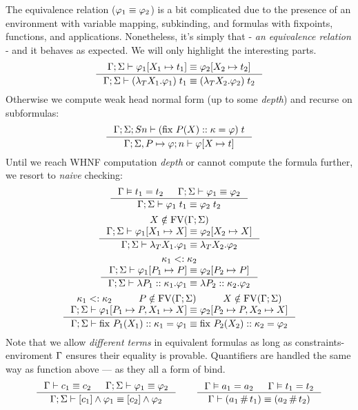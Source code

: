 \documentclass[english, mgr]{iithesis}
\begin{document}
The equivalence relation ($\varphi_1 \equiv \varphi_2$) is a bit complicated
due to the presence of an environment with variable mapping, subkinding, and formulas
with fixpoints, functions, and applications.
Nonetheless, it's simply that - \textit{an equivalence relation} - and it
behaves as expected. We will only highlight the interesting parts.
$$
  \inference{
    \jgmnt[\Gamma; \Sigma]{\formphi_1[\termv_1 \mapsto  \term_1] \equiv \formphi_2[\termv_2 \mapsto \term_2] }
    }{
    \jgmnt[\Gamma; \Sigma]{(\fLamTerm{\termv_1}\formphi_1) \fAppTerm \term_1 \equiv (\fLamTerm{\termv_2}\formphi_2) \fAppTerm \term_2}
  }
$$
Otherwise we compute weak head normal form (up to some \textit{depth}) and recurse on subformulas:
$$
  \inference{
    \jgmnt[\Gamma; \Sigma; S n]{(\fix{P}{\termv}{\kind}\formphi) \fAppTerm \term}
    }{
    \jgmnt[\Gamma; \Sigma, P \mapsto \formphi; n]{\formphi[\termv \mapsto \term]}
  }
$$
Until we reach WHNF computation \textit{depth} or cannot compute the formula further,
we resort to \textit{naive} checking:
$$
  \inference{
    \cjgmnt[\Gamma]{\term_1 \ceq \term_2} &
    \jgmnt[\Gamma; \Sigma]{\formphi_1 \equiv \formphi_2 }
    }{
    \jgmnt[\Gamma; \Sigma]{\formphi_1 \fAppTerm \term_1 \equiv \formphi_2 \fAppTerm \term_2 }
  }
$$
$$
  \inference{
    \termv \notin \fv[\Gamma; \Sigma] \\
    \jgmnt[\Gamma; \Sigma]{\formphi_1[\termv_1 \mapsto \termv] \equiv \formphi_2[\termv_2 \mapsto \termv] }
    }{
    \jgmnt[\Gamma; \Sigma]{\fLamTerm{\termv_1}\formphi_1 \equiv \fLamTerm{\termv_2}\formphi_2 }
  }
$$
$$
  \inference{
    \kind_1 \subkind \kind_2 \\
    \jgmnt[\Gamma; \Sigma]{\formphi_1[P_1 \mapsto P] \equiv \formphi_2[P_2 \mapsto P] }
    }{
    \jgmnt[\Gamma; \Sigma]{\fLamForm{P_1}{\kind_1}{\formphi_1} \equiv \fLamForm{P_2}{\kind_2}{\formphi_2}}
  }
$$
$$
  \inference{
    \kind_1 \subkind \kind_2 &
    P \notin \fv[\Gamma; \Sigma] & \termv \notin \fv[\Gamma; \Sigma] \\
    \jgmnt[\Gamma; \Sigma]{\formphi_1[P_1 \mapsto P, \termv_1 \mapsto \termv] \equiv \formphi_2[P_2 \mapsto P, \termv_2 \mapsto \termv] }
    }{
    \jgmnt[\Gamma; \Sigma]{\fix{P_1}{\termv_1}{\kind_1}\formphi_1 \equiv \fix{P_2}{\termv_2}{\kind_2}\formphi_2}
  }
$$
Note that we allow \textit{different terms} in equivalent formulas as long as
constraints-enviroment $\Gamma$ ensures their equality is provable.
Quantifiers are handled the same way as function above --- as they all a form of bind.
\begin{eqnarray*}
  \inference{
    \jgmnt[\Gamma]{\constr_1 \equiv \constr_2 } &
    \jgmnt[\Gamma; \Sigma]{\formphi_1 \equiv \formphi_2 }
  }{
    \jgmnt[\Gamma; \Sigma]{\fCAnd{\constr_1}\formphi_1 \equiv \fCAnd{\constr_2}\formphi_2 }
  }
\qquad
  \inference{
    \cjgmnt[\Gamma]{\atomv_1 \ceq \atomv_2 } & \cjgmnt[\Gamma]{\term_1 \ceq \term_2 }
  }{
    \jgmnt[\Gamma]{(\atomv_1 \cfresh \term_1) \equiv (\atomv_2 \cfresh \term_2) }
  }
\end{eqnarray*}
\end{document}
